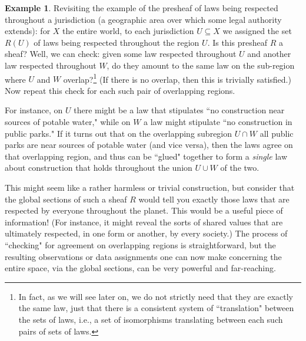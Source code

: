 \documentclass[11pt]{book}
\theoremstyle{definition}
\newtheorem{example}{Example}[section]
\theoremstyle{definition}
\theoremstyle{definition}
\theoremstyle{theorem}
\theoremstyle{definition}
\begin{document}
	\begin{example}
	Revisiting the example of the presheaf of laws being respected throughout a jurisdiction (a geographic area over which some legal authority extends): for $X$ the entire world, to each jurisdiction $U \subseteq  X$ we assigned the set $R(U)$ of laws being respected throughout the region $U$. Is this presheaf $R$ a sheaf? Well, we can check: given some law respected throughout $U$ and another law respected throughout $W$, do they amount to the same law on the sub-region where $U$ and $W$ overlap?\footnote{In fact, as we will see later on, we do not strictly need that they are exactly the same law, just that there is a consistent system of ``translation" between the sets of laws, i.e., a set of isomorphisms translating between each such pairs of sets of laws.} (If there is no overlap, then this is trivially satisfied.) Now repeat this check for each such pair of overlapping regions.  \par 
	For instance, on $U$ there might be a law that stipulates ``no construction near sources of potable water," while on $W$ a law might stipulate ``no construction in public parks." If it turns out that on the overlapping subregion $U \cap W$ all public parks are near sources of potable water (and vice versa), then the laws agree on that overlapping region, and thus can be ``glued" together to form a \textit{single} law about construction that holds throughout the union $U \cup W$ of the two.  \par 
This might seem like a rather harmless or trivial construction, but consider that the global sections of such a sheaf $R$ would tell you exactly those laws that are respected by everyone throughout the planet. This would be a useful piece of information! (For instance, it might reveal the sorts of shared values that are ultimately respected, in one form or another, by every society.) The process of ``checking" for agreement on overlapping regions is straightforward, but the resulting observations or data assignments one can now make concerning the entire space, via the global sections, can be very powerful and far-reaching.   
\end{example}
\end{document}
